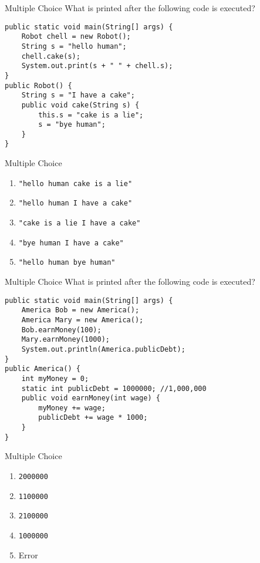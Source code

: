 \documentclass[9pt]{beamer}
\begin{document}
\begin{frame}[fragile]{Multiple Choice}
  What is printed after the following code is executed?

  \begin{lstlisting}
public static void main(String[] args) {
    Robot chell = new Robot();
    String s = "hello human";
    chell.cake(s);
    System.out.print(s + " " + chell.s);
}
public Robot() {
    String s = "I have a cake";
    public void cake(String s) {
        this.s = "cake is a lie";
        s = "bye human";
    }
}
      \end{lstlisting}
\end{frame}
\begin{frame}[fragile]{Multiple Choice}
  \begin{enumerate}
    \item
      \alert<2>{{\tt "hello human cake is a lie"}}
    \item
      {\tt "hello human I have a cake"}
    \item
      {\tt "cake is a lie I have a cake"}
    \item
      {\tt "bye human I have a cake"}
    \item
      {\tt "hello human bye human"}
  \end{enumerate}
\end{frame}

\begin{frame}[fragile]{Multiple Choice}
  What is printed after the following code is executed?

  \begin{lstlisting}
public static void main(String[] args) {
    America Bob = new America();
    America Mary = new America();
    Bob.earnMoney(100);
    Mary.earnMoney(1000);
    System.out.println(America.publicDebt);
}
public America() {
    int myMoney = 0;
    static int publicDebt = 1000000; //1,000,000
    public void earnMoney(int wage) {
        myMoney += wage;
        publicDebt += wage * 1000;
    }
}
      \end{lstlisting}
\end{frame}
\begin{frame}[fragile]{Multiple Choice}
  \begin{enumerate}
    \item
      {\tt 2000000}
    \item
      {\tt 1100000}
    \item
      \alert<2>{{\tt 2100000}}
    \item
      {\tt 1000000}
    \item
      Error
  \end{enumerate}
\end{frame}
\end{document}
